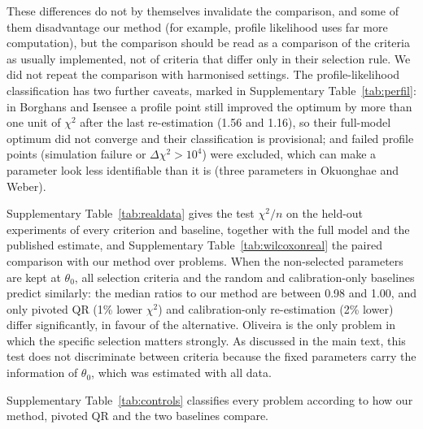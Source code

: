 These differences do not by themselves invalidate the comparison, and some of them disadvantage our method (for example, profile likelihood uses far more computation), but the comparison should be read as a comparison of the criteria as usually implemented, not of criteria that differ only in their selection rule. We did not repeat the comparison with harmonised settings. The profile-likelihood classification has two further caveats, marked in Supplementary Table~\ref{tab:perfil}: in Borghans and Isensee a profile point still improved the optimum by more than one unit of $\chi^2$ after the last re-estimation (1.56 and 1.16), so their full-model optimum did not converge and their classification is provisional; and failed profile points (simulation failure or $\Delta\chi^2>10^4$) were excluded, which can make a parameter look less identifiable than it is (three parameters in Okuonghae and Weber).

{\scriptsize\setlength{\tabcolsep}{3pt}

}


Supplementary Table~\ref{tab:realdata} gives the test $\chi^2/n$ on the held-out experiments of every criterion and baseline, together with the full model and the published estimate, and Supplementary Table~\ref{tab:wilcoxonreal} the paired comparison with our method over problems. When the non-selected parameters are kept at $\theta_0$, all selection criteria and the random and calibration-only baselines predict similarly: the median ratios to our method are between 0.98 and 1.00, and only pivoted QR (1\% lower $\chi^2$) and calibration-only re-estimation (2\% lower) differ significantly, in favour of the alternative. Oliveira is the only problem in which the specific selection matters strongly. As discussed in the main text, this test does not discriminate between criteria because the fixed parameters carry the information of $\theta_0$, which was estimated with all data.

{\scriptsize\setlength{\tabcolsep}{3pt}

}

{\small

}

Supplementary Table~\ref{tab:controls} classifies every problem according to how our method, pivoted QR and the two baselines compare.

